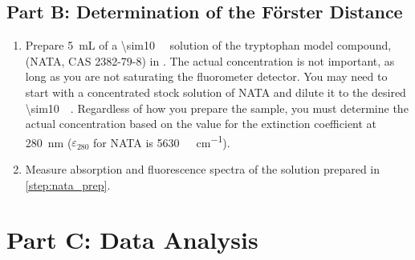 
\subsection{Part B: Determination of the Förster Distance} %
\label{sub:part_b_determination_of_the_forster_distance}

\begin{enumerate}
	\item Prepare \qty{5}{\mL} of a \qty{\sim10}{\micro\Molar} solution of the tryptophan model compound,  (NATA, CAS 2382-79-8) in . 
	The actual concentration is not important, as long as you are not saturating the fluorometer detector. 
	You may need to start with a concentrated stock solution of NATA and dilute it to the desired \qty{\sim10}{\micro\Molar}. 
	Regardless of how you prepare the sample, you must determine the actual concentration based on the value for the extinction coefficient at \qty{280}{\nm} (\( \varepsilon_{280} \) for NATA is \qty{5630}{\per\Molar\per\cm}).
	\label{step:nata_prep}
	\item Measure absorption and fluorescence spectra of the solution prepared in \cref{step:nata_prep}.
	\label{step:nata_spectrum} 
\end{enumerate}


\section{Part C: Data Analysis} %
\label{sec:part_c_data_analysis}

